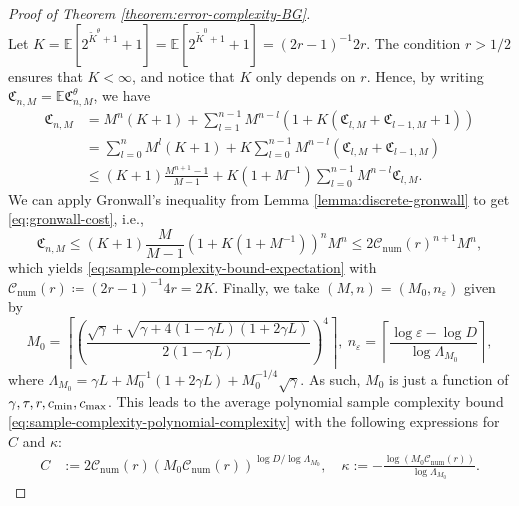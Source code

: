 \documentclass[11pt]{article}
\numberwithin{equation}{section}
\theoremstyle{definition}
\theoremstyle{remark}
\begin{document}
\begin{proof}[Proof of Theorem \ref{theorem:error-complexity-BG}]
\[    \]
    Let $K = \mathbb E\left[2^{\tilde K^\theta + 1} + 1\right] = \mathbb E\left[2^{\tilde K^0 + 1} + 1\right] = (2r - 1)^{-1}2r$. The condition $r > 1/2$ ensures that $K < \infty$, and notice that $K$ only depends on $r$. Hence, by writing $\mathfrak C_{n,M} = \mathbb E \mathfrak C^\theta_{n,M}$, we have
    \[
        \begin{aligned}
            \mathfrak C _{n,M} & = M ^{n}(K + 1) + \sum_{l = 1}^{n-1} M ^{n - l}\left( 1
            + K(\mathfrak C _{l,M} + \mathfrak C _{l-1,M} + 1)\right)                                                                    \\
                              & = \sum_{l = 0}^n M^l (K + 1) + K\sum_{l = 0}^{n-1} M ^{n - l} (\mathfrak C _{l,M} + \mathfrak C_{l-1,M}) \\
                              & \leq (K+1) \frac{M^{n+1} - 1}{M - 1} + K(1 + M^{-1}) \sum_{l = 0}^{n-1} M^{n-l} \mathfrak C_{l,M}.
        \end{aligned}
    \]
    We can apply Gronwall's inequality from Lemma \ref{lemma:discrete-gronwall} to get \eqref{eq:gronwall-cost}, i.e.,\
    \[
        \mathfrak C_{n,M} \leq (K + 1) \frac{M}{M-1} (1 + K (1 + M^{-1}))^n M^n \leq 2 \mathcal C_{\mathrm{num}}(r)^{n+1} M^{n},
    \]
    which yields \eqref{eq:sample-complexity-bound-expectation} with $\mathcal C_{\mathrm{num}}(r) \coloneqq (2r - 1)^{-1}4r = 2K$. Finally, we take $(M,n) = (M_0,n_\varepsilon)$ given by 
    \[
        M_0 = \left\lceil \left(\frac{\sqrt{\gamma} + \sqrt{\gamma + 4(1 - \gamma L)(1 + 2\gamma L)}}{2(1- \gamma L)} \right)^4 \right\rceil , \: n_\varepsilon = \left\lceil  \frac{\log \varepsilon - \log D}{\log \Lambda_{M_0}}\right\rceil,
    \]
    where $\Lambda_{M_0} = \gamma L + M_0^{-1}(1 + 2 \gamma L) + M_0^{-1/4}\sqrt{\gamma}$. As such, $M_0$ is just a function of $\gamma, \tau,r, c_{\min}, \\c_{\max}$.
    This leads to the average polynomial sample complexity bound \eqref{eq:sample-complexity-polynomial-complexity} with the following expressions for $C$ and $ \kappa$:
    \begin{equation}
    \label{eq:def-K-kappa}
        \begin{aligned}
            C & := 2 \mathcal C_{\mathrm{num}}(r) (M_0 \mathcal C_{\mathrm{num}}(r))^{\log D / \log \Lambda_{M_0}}, \quad 
            \kappa       := - \frac{\log( M_0 \mathcal C_{\mathrm{num}}(r))}{\log \Lambda_{M_0}}.
        \end{aligned}
    \end{equation}
\end{proof}
\end{document}
